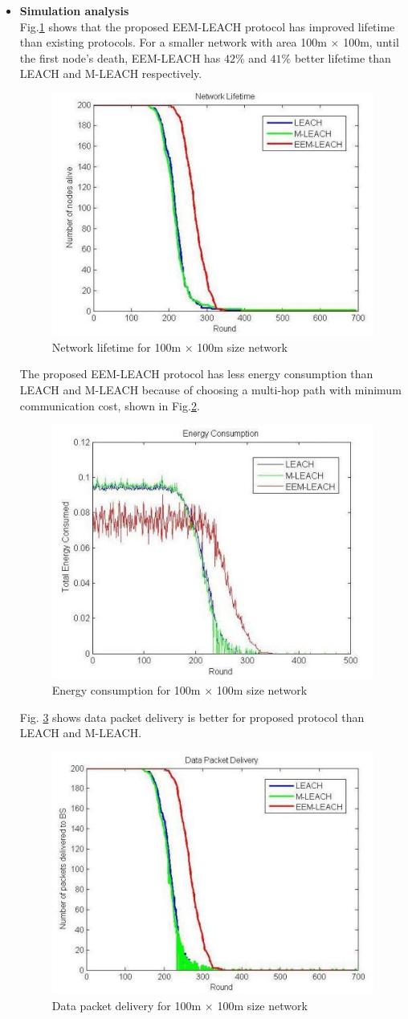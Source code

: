 \documentclass[11pt]{report}
\begin{document}
	\begin{itemize}
		\item \textbf{Simulation analysis}\\
		Fig.\ref{fig9} shows that the proposed EEM-LEACH protocol has improved lifetime than existing protocols. For a smaller network with area 100m $\times$ 100m, until the first node's death, EEM-LEACH has $42\%$ and $41\%$ better lifetime than LEACH and M-LEACH respectively.\\   
		\begin{figure}[h!]
			\centering
			\includegraphics[width=0.45\linewidth]{9th.jpg}
			\caption{Network lifetime for 100m $\times$ 100m size network}
			\label{fig9}
		\end{figure}
	
		\noindent The proposed EEM-LEACH protocol has less energy consumption than LEACH and M-LEACH because of choosing a multi-hop path with minimum communication cost, shown in Fig.\ref{fig10}.\\
		\begin{figure}[h!]
			\centering
			\includegraphics[width=0.45\linewidth]{10th.jpg}
			\caption{Energy consumption for 100m $\times$ 100m size network}
			\label{fig10} 
		\end{figure}
	
		\noindent Fig. \ref{fig11} shows data packet delivery is better for proposed protocol than LEACH and M-LEACH.
		\begin{figure}[h!]
			\centering
			\includegraphics[width=0.45\linewidth]{11th.jpg}
			\caption{Data packet delivery for 100m $\times$ 100m size network}
			\label{fig11} 
		\end{figure}
	\end{itemize}
	
\end{document}

